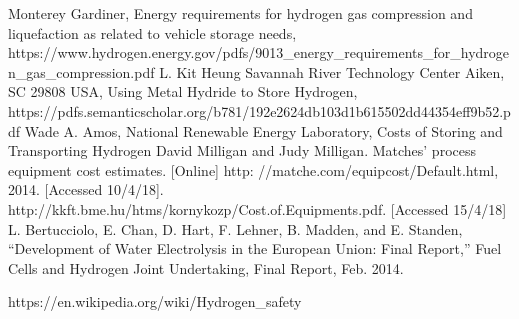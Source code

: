 \begin{thebibliography}{99}
Monterey Gardiner, Energy requirements for hydrogen gas compression and liquefaction as related to vehicle storage needs, https://www.hydrogen.energy.gov/pdfs/9013\_energy\_requirements\_for\_hydrogen\_gas\_compression.pdf
L. Kit Heung Savannah River Technology Center Aiken, SC 29808 USA, Using Metal Hydride to Store Hydrogen, https://pdfs.semanticscholar.org/b781/192e2624db103d1b615502dd44354eff9b52.pdf
Wade A. Amos, National Renewable Energy Laboratory, Costs of Storing and Transporting Hydrogen
David Milligan and Judy Milligan. Matches’ process equipment cost estimates. [Online] http: //matche.com/equipcost/Default.html, 2014. [Accessed 10/4/18].
http://kkft.bme.hu/htms/kornykozp/Cost.of.Equipments.pdf. [Accessed 15/4/18]
L. Bertucciolo, E. Chan, D. Hart, F. Lehner, B. Madden, and E. Standen, “Development of Water Electrolysis in the European Union: Final Report,” Fuel Cells and Hydrogen Joint Undertaking, Final Report, Feb. 2014.

https://en.wikipedia.org/wiki/Hydrogen\_safety



\end{thebibliography}










%






